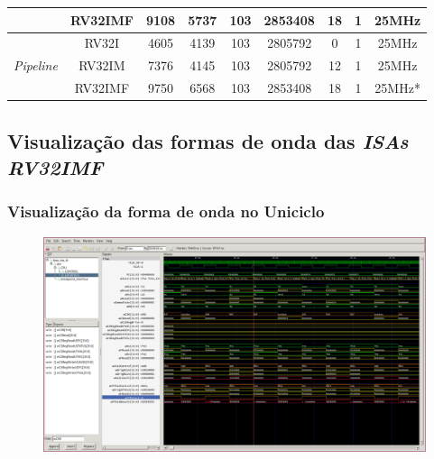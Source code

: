 \documentclass[aspectratio=169]{beamer}
\begin{document}
\begin{frame}
\begin{footnotesize}
\begin{longtable}{cc|c|c|c|c|c|c|c|}
            \cline{2-9}
            \multicolumn{1}{|c}{ }                                  & \multicolumn{1}{|c|}{RV32IMF} & 9108  & 5737  & 103   & 2853408   & 18    & 1     & 25MHz     \\
            \hline
            \multicolumn{1}{|c}{\multirow{3}{*}{\textit{Pipeline}}} & \multicolumn{1}{|c|}{RV32I}   & 4605  & 4139  & 103   & 2805792   & 0     & 1     & 25MHz     \\*
            \cline{2-9}
            \multicolumn{1}{|c}{ }                                  & \multicolumn{1}{|c|}{RV32IM}  & 7376  & 4145  & 103   & 2805792   & 12    & 1     & 25MHz     \\*
            \cline{2-9}
            \multicolumn{1}{|c}{ }                                  & \multicolumn{1}{|c|}{RV32IMF} & 9750  & 6568  & 103   & 2853408   & 18    & 1     & 25MHz*    \\
            \hline
        \end{longtable}
        \end{footnotesize}
        \vfill
    \end{frame}

    \subsection{Visualização das formas de onda das \textit{ISAs RV32IMF}}
    \begin{frame}
        \frametitle{Visualização da forma de onda no Uniciclo}
        \vfill
        \begin{figure}[H]
        \centering
            \includegraphics[width=.95\textwidth,height=.85\textheight,keepaspectratio]{../images/gtkwave/gtkwave_uni.png}
        \end{figure}
        \vfill
    \end{frame}
\end{document}
